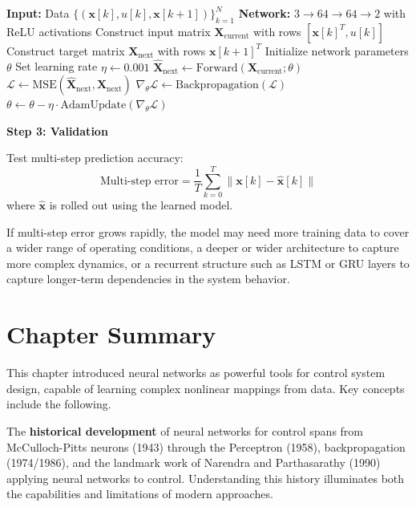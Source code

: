 \begin{algorithm}[htbp]
\caption{System Identification Training}
\label{alg:sysid_training}
\begin{algorithmic}[1]
\State \textbf{Input:} Data $\{(\mathbf{x}[k], u[k], \mathbf{x}[k+1])\}_{k=1}^{N}$
\State \textbf{Network:} $3 \to 64 \to 64 \to 2$ with ReLU activations
\State
\State Construct input matrix $\mathbf{X}_{\text{current}}$ with rows $[\mathbf{x}[k]^T, u[k]]$
\State Construct target matrix $\mathbf{X}_{\text{next}}$ with rows $\mathbf{x}[k+1]^T$
\State Initialize network parameters $\theta$
\State Set learning rate $\eta \gets 0.001$
\State
{}
    \State $\hat{\mathbf{X}}_{\text{next}} \gets \text{Forward}(\mathbf{X}_{\text{current}}; \theta)$
    \State $\mathcal{L} \gets \text{MSE}(\hat{\mathbf{X}}_{\text{next}}, \mathbf{X}_{\text{next}})$
    \State $\nabla_\theta \mathcal{L} \gets \text{Backpropagation}(\mathcal{L})$
    \State $\theta \gets \theta - \eta \cdot \text{AdamUpdate}(\nabla_\theta \mathcal{L})$
\EndFor
\end{algorithmic}
\end{algorithm}

\textbf{Step 3: Validation}

Test multi-step prediction accuracy:
\begin{equation}
\text{Multi-step error} = \frac{1}{T}\sum_{k=0}^{T} \|\mathbf{x}[k] - \hat{\mathbf{x}}[k]\|
\end{equation}
where $\hat{\mathbf{x}}$ is rolled out using the learned model.

If multi-step error grows rapidly, the model may need more training data to cover a wider range of operating conditions, a deeper or wider architecture to capture more complex dynamics, or a recurrent structure such as LSTM or GRU layers to capture longer-term dependencies in the system behavior.


\section{Chapter Summary}

This chapter introduced neural networks as powerful tools for control system design, capable of learning complex nonlinear mappings from data. Key concepts include the following.

The \textbf{historical development} of neural networks for control spans from McCulloch-Pitts neurons (1943) through the Perceptron (1958), backpropagation (1974/1986), and the landmark work of Narendra and Parthasarathy (1990) applying neural networks to control. Understanding this history illuminates both the capabilities and limitations of modern approaches.

